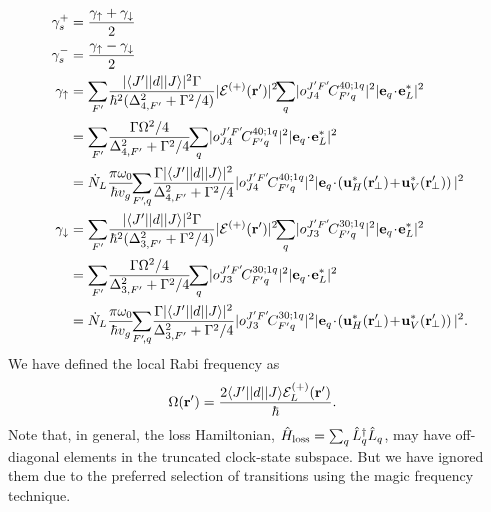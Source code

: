 \begin{align}
 \gamma_s^+ &= \frac{\gamma_{\uparrow}+\gamma_{\downarrow} }{2}\\
\gamma_s^- &= \frac{\gamma_{\uparrow}-\gamma_{\downarrow} }{2}\\
\!\!\!\!\!\!\!\! \gamma_{\uparrow} &=  \sum_{F'} \! \frac{|\bra{J'}|d|\ket{J}|^2\Gamma}{\hbar^2(\Delta_{4,F'}^2+\Gamma^2/4)}|\mathcal{E}^{(+)}(\br')|^2\!\! \sum_{q}\! |o^{J'F'}_{J4}\! C^{4 0;1q}_{F' q} |^2 |\mathbf{e}_q\!\cdot\! \mathbf{e}_L^*|^2\\
&=  \sum_{F'} \! \frac{\Gamma\Omega^2/4}{\Delta_{4,F'}^2+\Gamma^2/4}\!\! \sum_{q}\! |o^{J'F'}_{J4}\! C^{4 0;1q}_{F' q} |^2 |\mathbf{e}_q\!\cdot\! \mathbf{e}_L^*|^2\\
&= \dot{N}_L \frac{\pi \omega_0}{\hbar v_g} \!\!\sum_{F'\! , q}\! \frac{\Gamma |\bra{J'}|d|\ket{J}|^2}{\Delta_{4,F'}^2+\Gamma^2/4} |o^{J'F'}_{J4}\! C^{4 0;1q}_{F' q}|^2  %
|\mathbf{e}_q \!\cdot\! 
\left( \mathbf{u}_{H}^*(\br^\prime\!\!_\perp) \!+\! 
\mathbf{u}_{V}^*(\br^\prime\!\!_\perp)\right) |^2\\
\gamma_{\downarrow} &= \sum_{F'} \! \frac{|\bra{J'}|d|\ket{J}|^2\Gamma}{\hbar^2(\Delta_{3,F'}^2+\Gamma^2/4)}|\mathcal{E}^{(+)}(\br')|^2\!\! \sum_{q}\! |o^{J'F'}_{J3}\! C^{3 0;1q}_{F' q} |^2 |\mathbf{e}_q\!\cdot\! \mathbf{e}_L^*|^2\\
&=  \sum_{F'} \! \frac{\Gamma\Omega^2/4}{\Delta_{3,F'}^2+\Gamma^2/4}\!\! \sum_{q}\! |o^{J'F'}_{J3}\! C^{3 0;1q}_{F' q} |^2 |\mathbf{e}_q\!\cdot\! \mathbf{e}_L^*|^2\\
&= \dot{N}_L\frac{\pi \omega_0}{\hbar v_g} \!\!\sum_{F'\! , q}\! \frac{\Gamma |\bra{J'}|d|\ket{J}|^2}{\Delta_{3,F'}^2+\Gamma^2/4} |o^{J'F'}_{J3}\! C^{3 0;1q}_{F' q}|^2  %
|\mathbf{e}_q \!\cdot\! 
\left( \mathbf{u}_{H}^*(\br^\prime\!\!_\perp) \!+\! 
\mathbf{u}_{V}^*(\br^\prime\!\!_\perp)\right) |^2.
\end{align}
We have defined the local Rabi frequency as
\begin{align}
\Omega(\mathbf{r}') &= \frac{2\langle{J'}\rvert| d | \lvert{J}\rangle \mathcal{E}^{(+)}_L(\mathbf{r}')}{\hbar}.
\end{align}
Note that, in general, the loss Hamiltonian, $ \hat{H}_{\rm loss}=\sum_q \hat{L}_q^\dagger\hat{L}_q $, may have off-diagonal elements in the truncated clock-state subspace. But we have ignored them due to the preferred selection of transitions using the magic frequency technique. 


